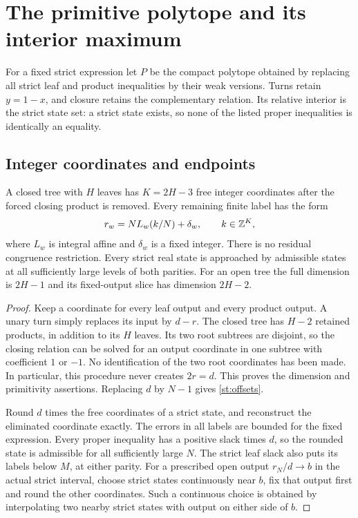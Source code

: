 \section{The primitive polytope and its interior maximum}\label{st:variation}
For a fixed strict expression let $P$ be the compact polytope
obtained by replacing all strict leaf and product inequalities
by their weak versions. Turns retain $y=1-x$, and closure
retains the complementary relation. Its relative interior is
the strict state set: a strict state exists, so none of the
listed proper inequalities is identically an equality.

\subsection{Integer coordinates and endpoints}
\begin{lemma}\label{st:lattice}
A closed tree with $H$ leaves has $K=2H-3$ free integer
coordinates after the forced closing product is removed.
Every remaining finite label has the form
\begin{equation}\label{st:offsets}
 r_w=NL_w(k/N)+\delta_w,\qquad k\in\mathbb Z^K,
\end{equation}
where $L_w$ is integral affine and $\delta_w$ is a fixed
integer. There is no residual congruence restriction.
Every strict real state is approached by admissible states
at all sufficiently large levels of both parities.
For an open tree the full dimension is $2H-1$ and its
fixed-output slice has dimension $2H-2$.
\end{lemma}
\begin{proof}
Keep a coordinate for every leaf output and every product
output. A unary turn simply replaces its input by $d-r$.
The closed tree has $H-2$ retained products, in addition
to its $H$ leaves. Its two root subtrees are disjoint,
so the closing relation can be solved for an output
coordinate in one subtree with coefficient $1$ or $-1$.
No identification of the two root coordinates has been
made. In particular, this procedure never creates $2r=d$.
This proves the dimension and primitivity assertions.
Replacing $d$ by $N-1$ gives \eqref{st:offsets}.

Round $d$ times the free coordinates of a strict state,
and reconstruct the eliminated coordinate exactly.
The errors in all labels are bounded for the fixed
expression. Every proper inequality has a positive
slack times $d$, so the rounded state is admissible
for all sufficiently large $N$. The strict leaf slack
also puts its labels below $M$, at either parity.
For a prescribed open output $r_N/d\to b$ in the actual
strict interval, choose strict states continuously
near $b$, fix that output first and round the other
coordinates. Such a continuous choice is obtained by
interpolating two nearby strict states with output
on either side of $b$.
\end{proof}

